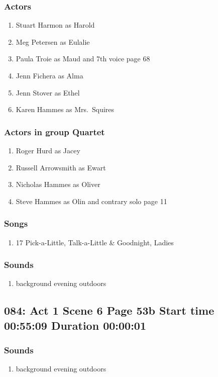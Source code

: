 \subsubsection{Actors}
\begin{enumerate}
\item Stuart Harmon as Harold
\item Meg Petersen as Eulalie
\item Paula Troie as Maud and 7th voice page 68
\item Jenn Fichera as Alma
\item Jenn Stover as Ethel
\item Karen Hammes as Mrs.~Squires
\end{enumerate}
\subsubsection{Actors in group Quartet}
\begin{enumerate}
\item Roger Hurd as Jacey
\item Russell Arrowsmith as Ewart
\item Nicholas Hammes as Oliver
\item Steve Hammes as Olin and contrary solo page 11
\end{enumerate}

\subsubsection{Songs}
\begin{enumerate}
\item 17 Pick-a-Little, Talk-a-Little \& Goodnight, Ladies
\end{enumerate}\subsubsection{Sounds}
\begin{enumerate}
\item background evening outdoors
\end{enumerate}
\subsection{084: Act 1 Scene 6 Page 53b Start time 00:55:09 Duration 00:00:01}
\subsubsection{Sounds}
\begin{enumerate}
\item background evening outdoors
\end{enumerate}
